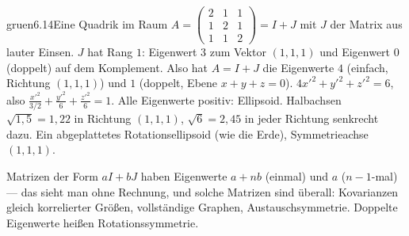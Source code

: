 \begin{loesungkarte}{gruen}{6.14}{Eine Quadrik im Raum}
$A = \begin{pmatrix}2 & 1 & 1\\ 1 & 2 & 1\\ 1 & 1 & 2\end{pmatrix} = I + J$ mit $J$ der Matrix aus lauter Einsen.
$J$ hat Rang $1$: Eigenwert $3$ zum Vektor $(1, 1, 1)$ und Eigenwert $0$ (doppelt) auf dem Komplement. Also hat $A = I + J$ die Eigenwerte $4$ (einfach, Richtung $(1, 1, 1)$) und $1$ (doppelt, Ebene $x + y + z = 0$).
$4x'^{2} + y'^{2} + z'^{2} = 6$, also $\frac{x'^{2}}{3/2} + \frac{y'^{2}}6 + \frac{z'^{2}}6 = 1$. Alle Eigenwerte positiv: Ellipsoid. Halbachsen $\sqrt{1{,}5} = 1{,}22$ in Richtung $(1, 1, 1)$, $\sqrt6 = 2{,}45$ in jeder Richtung senkrecht dazu. Ein abgeplattetes Rotationsellipsoid (wie die Erde), Symmetrieachse $(1, 1, 1)$.
\begin{mitnehmen}\kastentext
Matrizen der Form $aI + bJ$ haben Eigenwerte $a + nb$ (einmal) und $a$ ($n - 1$-mal) --- das sieht man ohne Rechnung, und solche Matrizen sind überall: Kovarianzen gleich korrelierter Größen, vollständige Graphen, Austauschsymmetrie. Doppelte Eigenwerte heißen Rotationssymmetrie.
\end{mitnehmen}
\end{loesungkarte}

